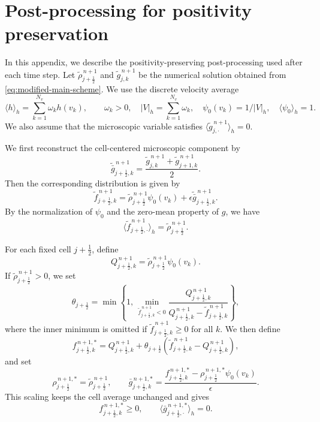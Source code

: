 \documentclass[11pt,twoside]{article}
\numberwithin{equation}{section}
\theoremstyle{plain}
\theoremstyle{nonumberplain}
\newif\ifrevisionred
\DeclareRobustCommand{\st}[1]{{\ifrevisionred\color{red}\fi #1}}
\begin{document}
\section{Post-processing for positivity preservation}
\label{sec:limiter}

In this appendix, we describe the positivity-preserving post-processing
used after each time step. Let
\(\tilde{\rho}_{j+\frac12}^{\,n+1}\) and
\(\tilde g_{j,k}^{\,n+1}\) be the numerical solution obtained from
\eqref{eq:modified-main-scheme}. We use the discrete velocity average
\[
    \langle h\rangle_h
    =
    \sum_{k=1}^{N_v}\omega_k h(v_k),
    \qquad
    \st{\omega_k>0,\quad |V|_h=\sum_{k=1}^{N_v}\omega_k,\quad
    \psi_0(v_k)=1/|V|_h,\quad \langle\psi_0\rangle_h=1.}
\]
We also assume that the microscopic variable satisfies
\(\langle \tilde g_{j,\cdot}^{\,n+1}\rangle_h=0\).

We first reconstruct the cell-centered microscopic component by
\[
    \tilde{\bar g}_{j+\frac12,k}^{\,n+1}
    =
    \frac{
    \tilde g_{j,k}^{\,n+1}
    +
    \tilde g_{j+1,k}^{\,n+1}
    }{2}.
\]
Then the corresponding distribution is given by
\[
    \tilde f_{j+\frac12,k}^{\,n+1}
    =
    \tilde\rho_{j+\frac12}^{\,n+1}\psi_0(v_k)
    +
    \epsilon \tilde{\bar g}_{j+\frac12,k}^{\,n+1}.
\]
By the normalization of \(\psi_0\) and the zero-mean property of \(g\),
we have
\[
    \langle \tilde f_{j+\frac12,\cdot}^{\,n+1}\rangle_h
    =
    \tilde\rho_{j+\frac12}^{\,n+1}.
\]

For each fixed cell \(j+\frac12\), define
\[
    Q_{j+\frac12,k}^{\,n+1}
    =
    \tilde\rho_{j+\frac12}^{\,n+1}\psi_0(v_k).
\]
If \(\tilde\rho_{j+\frac12}^{\,n+1}>0\), we set
\[
    \theta_{j+\frac12}
    =
    \min\left\{
    1,\,
    \min_{\tilde f_{j+\frac12,k}^{\,n+1}<0}
    \frac{
    Q_{j+\frac12,k}^{\,n+1}
    }{
    Q_{j+\frac12,k}^{\,n+1}
    -
    \tilde f_{j+\frac12,k}^{\,n+1}
    }
    \right\},
\]
where the inner minimum is omitted if
\(\tilde f_{j+\frac12,k}^{\,n+1}\ge0\) for all \(k\). We then define
\[
    f_{j+\frac12,k}^{\,n+1,*}
    =
    Q_{j+\frac12,k}^{\,n+1}
    +
    \theta_{j+\frac12}
    \left(
    \tilde f_{j+\frac12,k}^{\,n+1}
    -
    Q_{j+\frac12,k}^{\,n+1}
    \right),
\]
and set
\[
    \rho_{j+\frac12}^{\,n+1,*}
    =
    \tilde\rho_{j+\frac12}^{\,n+1},
    \qquad
    \bar g_{j+\frac12,k}^{\,n+1,*}
    =
    \frac{
    f_{j+\frac12,k}^{\,n+1,*}
    -
    \rho_{j+\frac12}^{\,n+1,*}\psi_0(v_k)
    }{\epsilon}.
\]
This scaling keeps the cell average unchanged and gives
\[
    f_{j+\frac12,k}^{\,n+1,*}\ge0,
    \qquad
    \langle \bar g_{j+\frac12,\cdot}^{\,n+1,*}\rangle_h=0 .
\]
\end{document}
